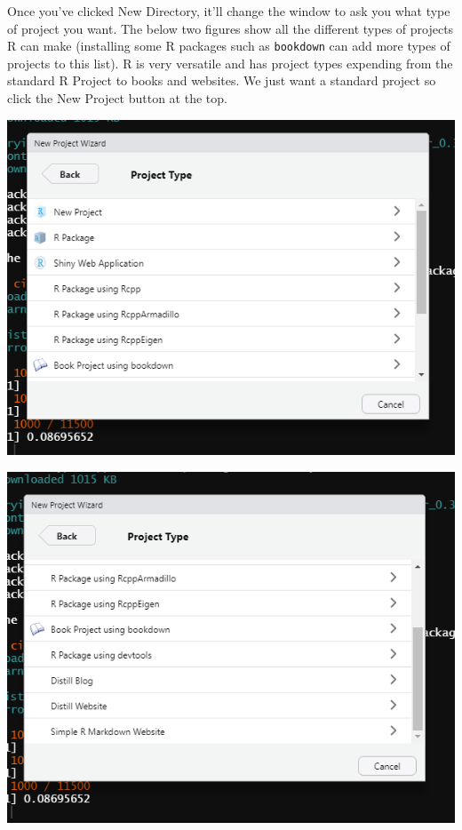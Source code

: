 \documentclass[
  12pt,
]{book}
\begin{document}
Once you've clicked New Directory, it'll change the window to ask you what type of project you want. The below two figures show all the different types of projects R can make (installing some R packages such as \texttt{bookdown} can add more types of projects to this list). R is very versatile and has project types expending from the standard R Project to books and websites. We just want a standard project so click the New Project button at the top.

\includegraphics{images/new_project_2.PNG}

\includegraphics{images/new_project_3.PNG}
\end{document}
